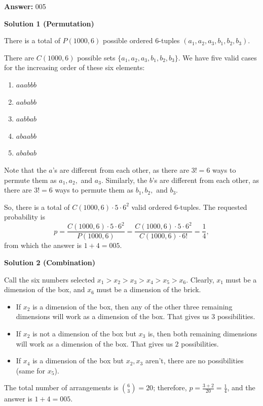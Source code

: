 \begin{enumerate}
 
 \textbf{Answer: }005



\textbf{Solution 1 (Permutation)}

There is a total of $P(1000,6)$ possible ordered $6$-tuples $(a_1,a_2,a_3,b_1,b_2,b_3).$

 There are $C(1000,6)$ possible sets $\{a_1,a_2,a_3,b_1,b_2,b_3\}.$ We have five valid cases for the increasing order of these six elements:

 
            \begin{enumerate} 
        \item $aaabbb$

        \item $aababb$

        \item $aabbab$

        \item $abaabb$

        \item $ababab$

            \end{enumerate}
            Note that the $a$'s are different from each other, as there are $3!=6$ ways to permute them as $a_1,a_2,$ and $a_3.$ Similarly, the $b$'s are different from each other, as there are $3!=6$ ways to permute them as $b_1,b_2,$ and $b_3.$

 So, there is a total of $C(1000,6)\cdot5\cdot6^2$ valid ordered $6$-tuples. The requested probability is 
 \[p=\frac{C(1000,6)\cdot5\cdot6^2}{P(1000,6)}=\frac{C(1000,6)\cdot5\cdot6^2}{C(1000,6)\cdot6!}=\frac14,\] from which the answer is $1+4=\boxed{005}.$




\textbf{Solution 2 (Combination)}

Call the six numbers selected $x_1 > x_2 > x_3 > x_4 > x_5 > x_6$. Clearly, $x_1$ must be a dimension of the box, and $x_6$ must be a dimension of the brick. 

 
            \begin{itemize}
        \item If $x_2$ is a dimension of the box, then any of the other three remaining dimensions will work as a dimension of the box. That gives us $3$ possibilities.
        \item If $x_2$ is not a dimension of the box but $x_3$ is, then both remaining dimensions will work as a dimension of the box. That gives us $2$ possibilities.
        \item If $x_4$ is a dimension of the box but $x_2,x_3$ aren’t, there are no possibilities (same for $x_5$).
            \end{itemize}
            The total number of arrangements is ${6\choose3} = 20$; therefore, $p = \frac{3 + 2}{20} = \frac{1}{4}$, and the answer is $1 + 4 = \boxed{005}$.


\end{enumerate}
